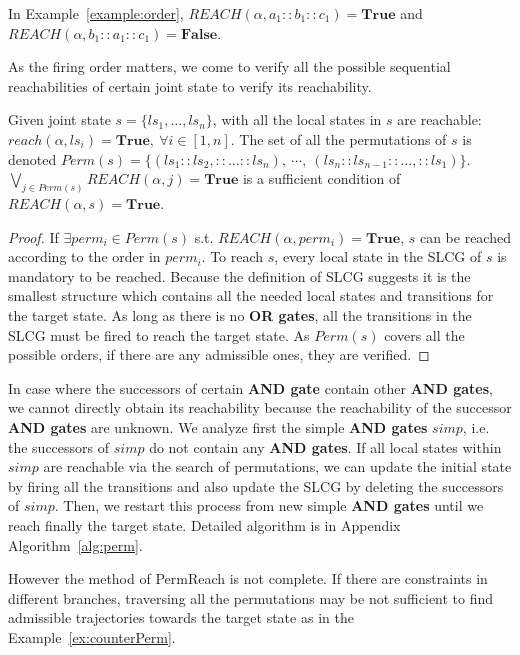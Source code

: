 In Example~\ref{example:order}, $REACH(\alpha,a_1::b_1::c_1)=\mathbf{True}$ and $REACH(\alpha,b_1::a_1::c_1)=\mathbf{False}$.


As the firing order matters, we come to verify all the possible sequential reachabilities of certain joint state to verify its reachability.

\begin{proposition}\label{theoperm}
Given joint state $s=\{ls_1,\ldots,ls_n\}$, with all the local states in $s$ are reachable: $reach(\alpha,ls_i)=\mathbf{True},\ \forall i\in[1,n]$.
The set of all the permutations of $s$ is denoted $Perm(s)=\{(ls_1::ls_2,::\ldots ::ls_n),\ \cdots,\ (ls_n::ls_{n-1}::\ldots,::ls_1)\}$.
$\bigvee_{j\in Perm(s)} REACH(\alpha,j)=\mathbf{True}$ is a sufficient condition of $REACH(\alpha,s)=\mathbf{True}$.
\end{proposition}

\begin{proof}
If $\exists perm_i\in Perm(s)$ s.t. $REACH(\alpha,perm_i)=\mathbf{True}$, $s$ can be reached according to the order in $perm_i$.
To reach $s$, every local state in the SLCG of $s$ is mandatory to be reached. 
Because the definition of SLCG suggests it is the smallest structure which contains all the needed local states and transitions for the target state.
As long as there is no \textbf{OR gates}, all the transitions in the SLCG must be fired to reach the target state.
As $Perm(s)$ covers all the possible orders, if there are any admissible ones, they are verified.
\end{proof}

In case where the successors of certain \textbf{AND gate} contain other \textbf{AND gates}, we cannot directly obtain its reachability because the reachability of the successor \textbf{AND gates} are unknown.
We analyze first the simple \textbf{AND gates} $simp$, i.e. the successors of $simp$ do not contain any \textbf{AND gates}.
If all local states within $simp$ are reachable via the search of permutations, we can update the initial state by firing all the transitions and also update the SLCG by deleting the successors of $simp$. 
Then, we restart this process from new simple \textbf{AND gates} until we reach finally the target state.
Detailed algorithm is in Appendix Algorithm~\ref{alg:perm}.

However the method of PermReach is not complete. 
If there are constraints in different branches, traversing all the permutations may be not sufficient to find admissible trajectories towards the target state as in the Example~\ref{ex:counterPerm}.

